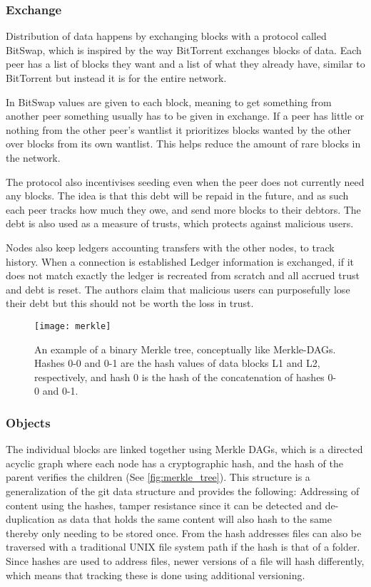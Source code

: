 \subsubsection{Exchange}
Distribution of data happens by exchanging blocks with a protocol called BitSwap, which is inspired by the way BitTorrent exchanges blocks of data. Each peer has a list of blocks they want and a list of what they already have, similar to BitTorrent but instead it is for the entire network.

In BitSwap values are given to each block, meaning to get something from another peer something usually has to be given in exchange. If a peer has little or nothing from the other peer's wantlist it prioritizes blocks wanted by the other over blocks from its own wantlist. This helps reduce the amount of rare blocks in the network.

The protocol also incentivises seeding even when the peer does not currently need any blocks. The idea is that this debt will be repaid in the future, and as such each peer tracks how much they owe, and send more blocks to their debtors. The debt is also used as a measure of trusts, which protects against malicious users.

Nodes also keep ledgers accounting transfers with the other nodes, to track history. When a connection is established Ledger information is exchanged, if it does not match exactly the ledger is recreated from scratch and all accrued trust and debt is reset. The authors claim that malicious users can purposefully lose their debt but this should not be worth the loss in trust.

\begin{figure}[ht]
    \centering
    \texttt{[image: merkle]}
    \caption[A Merkle Tree]{An example of a binary Merkle tree, conceptually like Merkle-\acsp{DAG}. Hashes 0-0 and 0-1 are the hash values of data blocks L1 and L2, respectively, and hash 0 is the hash of the concatenation of hashes 0-0 and 0-1.}
    \label{fig:merkle_tree}
\end{figure}

\subsubsection{Objects}
\label{sec:ipfs-objects}
The individual blocks are linked together using Merkle \acp{DAG}, which is a directed acyclic graph where each node has a cryptographic hash, and the hash of the parent verifies the children (See \autoref{fig:merkle_tree}). This structure is a generalization of the git data structure and provides the following: Addressing of content using the hashes, tamper resistance since it can be detected and de-duplication as data that holds the same content will also hash to the same thereby only needing to be stored once. From the hash addresses files can also be traversed with a traditional UNIX file system path if the hash is that of a folder.
Since hashes are used to address files, newer versions of a file will hash differently, which means that tracking these is done using additional versioning.




